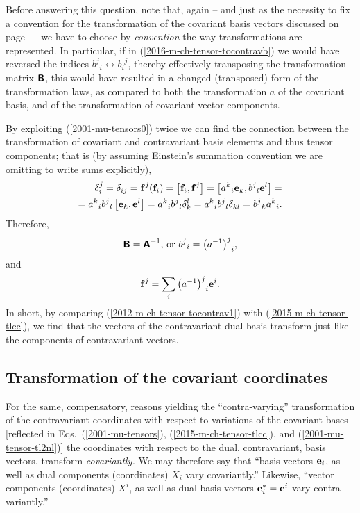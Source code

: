 Before answering this question, note that, again -- and just as the necessity to fix a convention for the transformation of the covariant basis vectors discussed on page~\pageref{2016-m-ch-fdvs-oic} --
we have to choose by {\em convention} the way transformations are represented.
In particular,
if in (\ref{2016-m-ch-tensor-tocontravb}) we would have reversed the indices ${b^j}_i \leftrightarrow {b_i}^j$, thereby effectively transposing the transformation matrix  $ \textsf{\textbf{B}} $,
this would have resulted in a changed (transposed) form of the transformation laws,
as compared to both the transformation $a$ of the covariant basis, and of the transformation of covariant vector components.

By exploiting (\ref{2001-mu-tensors0}) twice we can find the connection between
the transformation of covariant and contravariant basis elements and thus
tensor components; that is (by assuming Einstein's summation convention we are omitting to write sums explicitly),
\begin{equation}
\begin{split}
\delta_i^j= \delta_{ij}=
{\bf f}^j({\bf f}_i) =
\left[{\bf f}_i , {\bf f}^j \right]=
\left[ {a^k}_i {\bf e}_k ,  {b^j}_l {\bf e}^l \right] =
\\
=
{a^k}_i {b^j}_l  \left[ {\bf e}_k , {\bf e}^l \right]
={a^k}_i {b^j}_l   \delta_k^l
={a^k}_i {b^j}_l   \delta_{kl}
={b^j}_k {a^k}_i  .
\end{split}
\end{equation}
Therefore,
\begin{equation}
\textsf{\textbf{B}}
= \textsf{\textbf{A}}^{-1}
\textrm{, or }
{b^j}_i =  {\left( a^{-1} \right)^j}_i,
\label{2012-m-ch-tensor-tocontrav}
\end{equation}
and
\begin{equation}
{\bf f}^j=
\sum_i{\left( a^{-1}\right)^j}_i{\bf e}^i
.
\label{2012-m-ch-tensor-tocontrav1}
\end{equation}
In short, by comparing (\ref{2012-m-ch-tensor-tocontrav1})  with (\ref{2015-m-ch-tensor-tlcc}), we find that the vectors of the contravariant dual basis transform just like the components of contravariant vectors.

\subsection{Transformation of the covariant coordinates}

For the same, compensatory, reasons yielding the ``contra-varying'' transformation of the contravariant coordinates
with respect to variations of the covariant bases [reflected in Eqs.~(\ref{2001-mu-tensors}), (\ref{2015-m-ch-tensor-tlcc}), and (\ref{2001-mu-tensor-tl2nl})]
the coordinates with respect to the dual, contravariant, basis vectors, transform {\em covariantly.}
We may therefore say that
``basis vectors ${\bf e}_i$, as well as dual components (coordinates) $X_i$ vary covariantly.''
Likewise,
``vector components (coordinates) $X^i$, as well as dual basis vectors ${\bf e}^\ast_i= {\bf e}^i$ vary contra-variantly.''


